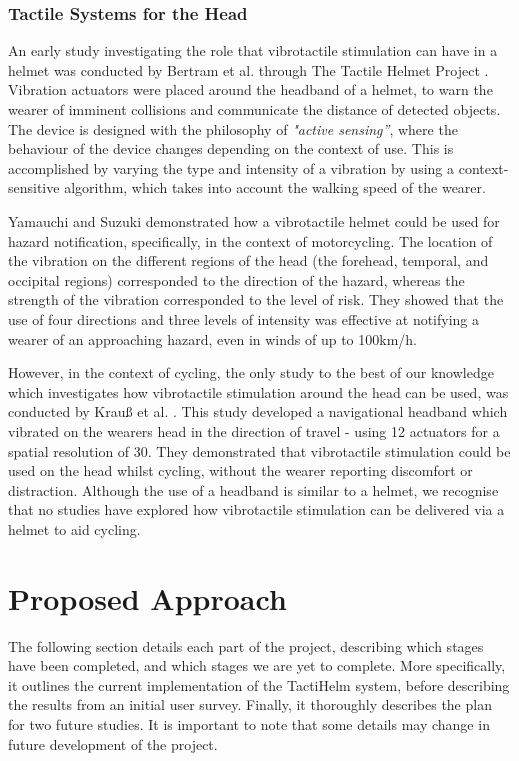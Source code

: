 \documentclass{interim}
\begin{document}
\subsubsection{Tactile Systems for the Head}
An early study investigating the role that vibrotactile stimulation can have in a helmet was conducted by Bertram et al. through The Tactile Helmet Project \cite{10.1007/978-3-642-39802-5_3}. Vibration actuators were placed around the headband of a helmet, to warn the wearer of imminent collisions and communicate the distance of detected objects. The device is designed with the philosophy of \textit{"active sensing”}, where the behaviour of the device changes depending on the context of use. This is accomplished by varying the type and intensity of a vibration by using a context-sensitive algorithm, which takes into account the walking speed of the wearer.

Yamauchi and Suzuki \cite{yamauchi2020vibro} demonstrated how a vibrotactile helmet could be used for hazard notification, specifically, in the context of motorcycling. The location of the vibration on the different regions of the head (the forehead, temporal, and occipital regions) corresponded to the direction of the hazard, whereas the strength of the vibration corresponded to the level of risk. They showed that the use of four directions and three levels of intensity was effective at notifying a wearer of an approaching hazard, even in winds of up to 100km/h.

However, in the context of cycling, the only study to the best of our knowledge which investigates how vibrotactile stimulation around the head can be used, was conducted by Krau{\ss} et al. \cite{krauss2021head}. This study developed a navigational headband which vibrated on the wearers head in the direction of travel - using 12 actuators for a spatial resolution of 30\degree{}. They demonstrated that vibrotactile stimulation could be used on the head whilst cycling, without the wearer reporting discomfort or distraction. Although the use of a headband is similar to a helmet, we recognise that no studies have explored how vibrotactile stimulation can be delivered via a helmet to aid cycling.



\section{Proposed Approach}
The following section details each part of the project, describing which stages have been completed, and which stages we are yet to complete. More specifically, it outlines the current implementation of the TactiHelm system, before describing the results from an initial user survey. Finally, it thoroughly describes the plan for two future studies. It is important to note that some details may change in future development of the project.
\end{document}
